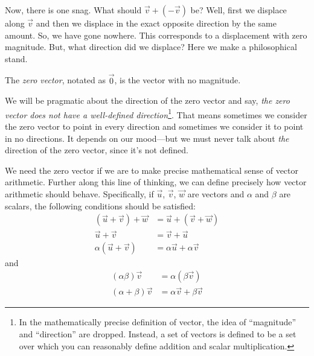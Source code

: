 \begin{center}
	\usetikzlibrary{patterns,decorations.pathreplacing}
\end{center}

Now, there is one snag.  What should $\vec v+(-\vec v)$ be?  Well, first we
displace along $\vec v$ and then we displace in the exact opposite direction
by the same amount.  So, we have gone nowhere.  This corresponds to a displacement
with zero magnitude.  But, what direction did we displace?  Here we make a philosophical
stand.
\begin{definition}
	The \emph{zero vector}, notated as $\vec 0$,
	is the vector with no magnitude.
\end{definition}
We will be pragmatic about the direction of the zero vector and say,
\emph{the zero vector does not have a well-defined direction}\footnote{
	In the mathematically precise definition of vector, the idea of ``magnitude''
	and ``direction'' are dropped.  Instead, a set of vectors is defined to be
	a set over which you can reasonably define addition and scalar multiplication.
}.  That means
sometimes we consider the zero vector to point in every direction and sometimes
we consider it to point in no directions.  It depends on our mood---but we must
never talk about \emph{the} direction of the zero vector, since it's not defined.

We need the zero vector if we are to make precise mathematical
sense of vector arithmetic.
Further along this line of thinking, we can define precisely how vector arithmetic
should behave.  Specifically, if $\vec u$, $\vec v$, $\vec w$ are vectors and $\alpha$ and $\beta$
are scalars, the
following conditions should be satisfied:
\begin{align*}
	(\vec u+\vec v)+\vec w&=\vec u+(\vec v+\vec w)\tag{Associativity}\\
	\vec u+\vec v&=\vec v+\vec u\tag{Commutativity}\\
	\alpha(\vec u+\vec v)&=\alpha\vec u+\alpha \vec v\tag{Distributivity}
\end{align*}
and
\begin{align*}
	(\alpha\beta)\vec v&=\alpha(\beta \vec v)\tag{Associativity II}\\
	(\alpha+\beta)\vec v&=\alpha\vec v+\beta \vec v\tag{Distributivity II}
\end{align*}

